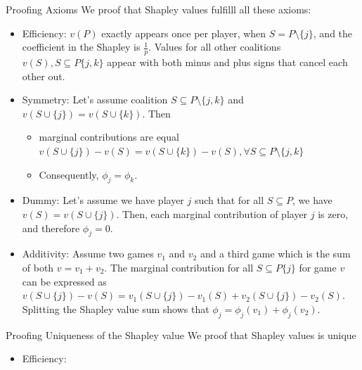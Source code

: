 \documentclass[11pt,compress,t,notes=noshow, xcolor=table]{beamer}
\begin{document}
\begin{vbframe}{Proofing Axioms}
  We proof that Shapley values fulfilll all these axioms:
\begin{itemize}
  \item Efficiency: $v(P)$ exactly appears once per player, when $S = P \setminus \{j\}$, and the coefficient in the Shapley is $\frac{1}{p}$. Values for all other coalitions $v(S), S \subseteq P \{j,k\}$ appear with both minus and plus signs that cancel each other out.
  \item Symmetry: Let's assume coalition $S \subseteq P \setminus \{j, k\}$ and $v(S \cup \{j\}) = v(S \cup \{k\})$. Then
    \begin{itemize}
        \item marginal contributions are equal $v(S \cup \{j\}) -  v(S) = v(S \cup \{k\}) -  v(S), \forall S \subseteq P \setminus \{j, k\}$
        \item Consequently, $\phi_j = \phi_k$.
    \end{itemize}
  \item Dummy: Let's assume we have player $j$ such that for all $S \subseteq P$, we have $v(S) = v(S \cup \{j\})$. Then, each marginal contribution of player $j$ is zero, and therefore $\phi_j = 0$.
  \item Additivity:  Assume two games $v_1$ and $v_2$ and a third game which is the sum of both $v = v_1 + v_2$. The marginal contribution for all $S \subseteq P \{j\}$ for game $v$ can be expressed as $v(S \cup \{j\}) - v(S) = v_1(S \cup \{j\}) - v_1(S) + v_2(S \cup \{j\}) - v_2(S)$. Splitting the Shapley value sum shows that $\phi_j = \phi_j(v_1) + \phi_j(v_2)$.
\end{itemize}
\end{vbframe}

\begin{vbframe}{Proofing Uniqueness of the Shapley value}
  We proof that Shapley values is unique
\begin{itemize}
    \item Efficiency: 
\end{itemize}
\end{vbframe}
\end{document}

